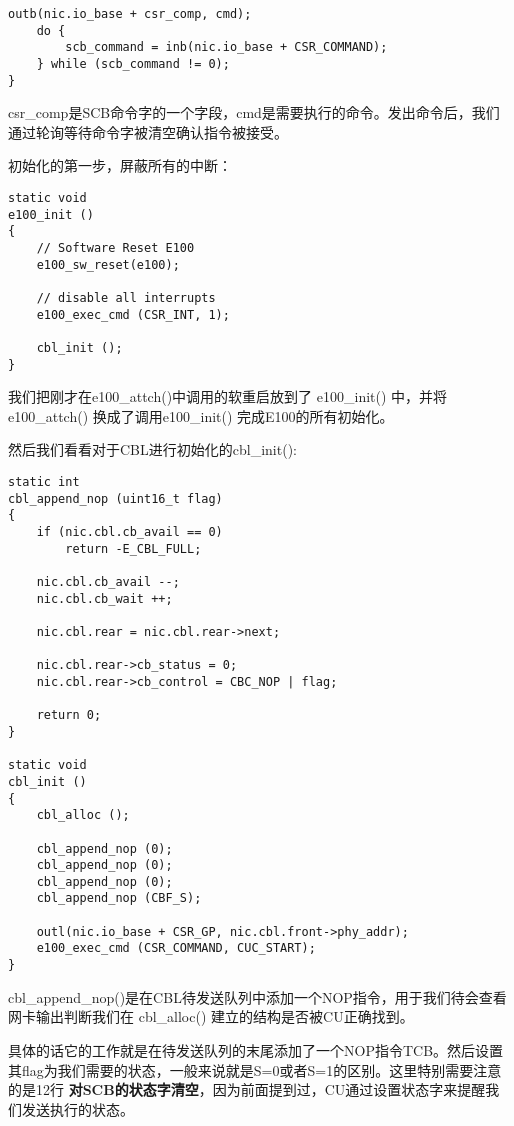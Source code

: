 \documentclass{article}
\newcommand{\highlight}[1]{{\bfseries \color{red}  #1}}
\newcommand{\funcname}[1]{{\ttfamily \small #1}}
\begin{document}
\begin{CJK*}{UTF8}{gkai}
\begin{lstlisting}[style=ccode, title={\scriptsize \ttfamily \bfseries kern/e100.c: e100\_exec\_cmd()}]
    outb(nic.io_base + csr_comp, cmd);
    do {
        scb_command = inb(nic.io_base + CSR_COMMAND);
    } while (scb_command != 0);
}
\end{lstlisting}

csr\_comp是SCB命令字的一个字段，cmd是需要执行的命令。发出命令后，我们通过轮询等待命令字被清空确认指令被接受。

初始化的第一步，屏蔽所有的中断：

\begin{lstlisting}[style=ccode, title={\scriptsize \ttfamily \bfseries kern/e100.c: e100\_init()}]
static void
e100_init ()
{
    // Software Reset E100
    e100_sw_reset(e100);

    // disable all interrupts
    e100_exec_cmd (CSR_INT, 1);

    cbl_init ();
}
\end{lstlisting}

我们把刚才在\funcname{e100\_attch()}中调用的软重启放到了 \funcname{e100\_init()} 中，并将 \funcname{e100\_attch()} 换成了调用\funcname{e100\_init()} 完成E100的所有初始化。

然后我们看看对于CBL进行初始化的\funcname{cbl\_init()}:

\begin{lstlisting}[style=ccode, title={\scriptsize \ttfamily \bfseries kern/e100.c: cbl\_init()}]
static int
cbl_append_nop (uint16_t flag)
{
    if (nic.cbl.cb_avail == 0)
        return -E_CBL_FULL;

    nic.cbl.cb_avail --;
    nic.cbl.cb_wait ++;

    nic.cbl.rear = nic.cbl.rear->next;

    nic.cbl.rear->cb_status = 0;
    nic.cbl.rear->cb_control = CBC_NOP | flag;

    return 0;
}

static void
cbl_init () 
{
    cbl_alloc ();

    cbl_append_nop (0);
    cbl_append_nop (0);
    cbl_append_nop (0);
    cbl_append_nop (CBF_S);

    outl(nic.io_base + CSR_GP, nic.cbl.front->phy_addr);
    e100_exec_cmd (CSR_COMMAND, CUC_START); 
}
\end{lstlisting}

\funcname{cbl\_append\_nop()}是在CBL待发送队列中添加一个NOP指令，用于我们待会查看网卡输出判断我们在 \funcname{cbl\_alloc()} 建立的结构是否被CU正确找到。

具体的话它的工作就是在待发送队列的末尾添加了一个NOP指令TCB。然后设置其flag为我们需要的状态，一般来说就是S=0或者S=1的区别。这里特别需要注意的是12行\highlight{对SCB的状态字清空}，因为前面提到过，CU通过设置状态字来提醒我们发送执行的状态。


\end{CJK*}
\end{document}
